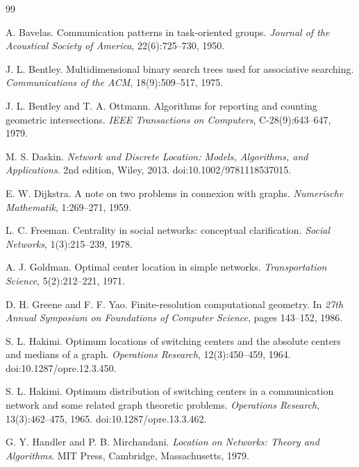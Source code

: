 \documentclass[11pt]{article}
\begin{document}
\begin{thebibliography}{99}

A. Bavelas.
\newblock Communication patterns in task-oriented groups.
\newblock \emph{Journal of the Acoustical Society of America},
22(6):725--730, 1950.

J. L. Bentley.
\newblock Multidimensional binary search trees used for associative searching.
\newblock \emph{Communications of the ACM}, 18(9):509--517, 1975.

J. L. Bentley and T. A. Ottmann.
\newblock Algorithms for reporting and counting geometric intersections.
\newblock \emph{IEEE Transactions on Computers}, C-28(9):643--647, 1979.

M. S. Daskin.
\newblock \emph{Network and Discrete Location: Models, Algorithms, and Applications}.
\newblock 2nd edition, Wiley, 2013.
\newblock doi:10.1002/9781118537015.

E. W. Dijkstra.
\newblock A note on two problems in connexion with graphs.
\newblock \emph{Numerische Mathematik}, 1:269--271, 1959.

L. C. Freeman.
\newblock Centrality in social networks: conceptual clarification.
\newblock \emph{Social Networks}, 1(3):215--239, 1978.

A. J. Goldman.
\newblock Optimal center location in simple networks.
\newblock \emph{Transportation Science}, 5(2):212--221, 1971.

D. H. Greene and F. F. Yao.
\newblock Finite-resolution computational geometry.
\newblock In \emph{27th Annual Symposium on Foundations of Computer Science},
pages 143--152, 1986.

S. L. Hakimi.
\newblock Optimum locations of switching centers and the absolute centers and
medians of a graph.
\newblock \emph{Operations Research}, 12(3):450--459, 1964.
\newblock doi:10.1287/opre.12.3.450.

S. L. Hakimi.
\newblock Optimum distribution of switching centers in a communication network
and some related graph theoretic problems.
\newblock \emph{Operations Research}, 13(3):462--475, 1965.
\newblock doi:10.1287/opre.13.3.462.

G. Y. Handler and P. B. Mirchandani.
\newblock \emph{Location on Networks: Theory and Algorithms}.
\newblock MIT Press, Cambridge, Massachusetts, 1979.


\end{thebibliography}
\end{document}
